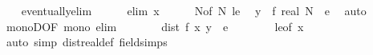 \begin{isabellebody}
\ \ \isamarkupfalse%
\ eventually{\isacharunderscore}{\kern0pt}elim\isanewline
\ \ \ \ \isamarkupfalse%
\ {\isacharparenleft}{\kern0pt}elim\ x{\isacharparenright}{\kern0pt}\isanewline
\ \ \ \ \isamarkupfalse%
\ N{\isacharbrackleft}{\kern0pt}of\ N{\isacharbrackright}{\kern0pt}\ le\ \isamarkupfalse%
\ {\isachardoublequoteopen}y\ {\isacharminus}{\kern0pt}\ f\ {\isacharparenleft}{\kern0pt}real\ N{\isacharparenright}{\kern0pt}\ {\isacharless}{\kern0pt}\ e{\isachardoublequoteclose}\ \isamarkupfalse%
\ auto\isanewline
\ \ \ \ \isamarkupfalse%
\ \isamarkupfalse%
\ monoD{\isacharbrackleft}{\kern0pt}OF\ mono\ elim{\isacharbrackright}{\kern0pt}\isanewline
\ \ \ \ \isamarkupfalse%
\ \isamarkupfalse%
\ {\isachardoublequoteopen}dist\ {\isacharparenleft}{\kern0pt}f\ x{\isacharparenright}{\kern0pt}\ y\ {\isacharless}{\kern0pt}\ e{\isachardoublequoteclose}\isanewline
\ \ \ \ \ \ \isamarkupfalse%
\ le{\isacharbrackleft}{\kern0pt}of\ x{\isacharbrackright}{\kern0pt}\ \isamarkupfalse%
\ {\isacharparenleft}{\kern0pt}auto\ simp{\isacharcolon}{\kern0pt}\ dist{\isacharunderscore}{\kern0pt}real{\isacharunderscore}{\kern0pt}def\ field{\isacharunderscore}{\kern0pt}simps{\isacharparenright}{\kern0pt}\isanewline
\ \ \isamarkupfalse%
\isanewline
{}\isamarkupfalse%
%
\endisatagproof
{\isafoldproof}%
%
\isadelimproof
\isanewline
%
\endisadelimproof
%
\isadelimtheory
\isanewline
%
\endisadelimtheory
%
\isatagtheory
{}\isamarkupfalse%
%
\endisatagtheory
{\isafoldtheory}%
%
\isadelimtheory
%
\endisadelimtheory
%
\end{isabellebody}%
\endinput
